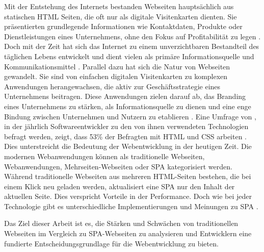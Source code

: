 

Mit der Entstehung des Internets bestanden Webseiten hauptsächlich aus statischen \ac{HTML} Seiten, die oft nur als digitale Visitenkarten dienten. 
Sie präsentierten grundlegende Informationen wie Kontaktdaten, Produkte oder Dienstleistungen eines Unternehmens, ohne den Fokus auf Profitabilität zu legen \cite{Bly2018}.
Doch mit der Zeit hat sich das Internet zu einem unverzichtbaren Bestandteil des täglichen Lebens entwickelt und dient vielen als primäre Informationsquelle und Kommunikationsmittel \cite{conf/pi/Sassenberg}.
Parallel dazu hat sich die Natur von Webseiten gewandelt. 
Sie sind von einfachen digitalen Visitenkarten zu komplexen Anwendungen herangewachsen, die aktiv zur Geschäftsstrategie eines Unternehmens beitragen. 
Diese Anwendungen zielen darauf ab, das Branding eines Unternehmens zu stärken, als Informationsquelle zu dienen und eine enge Bindung zwischen Unternehmen und Nutzern zu etablieren \cite{Bly2018}.
Eine Umfrage von , in der jährlich Softwareentwickler zu den von ihnen verwendeten Technologien befragt werden, zeigt, dass 53\% der Befragten mit \ac{HTML} und \ac{CSS} arbeiten \cite{StackOverflow2023}.
Dies unterstreicht die Bedeutung der Webentwicklung in der heutigen Zeit.
Die modernen Webanwendungen können als traditionelle Webseiten, Webanwendungen, Mehrseiten-Webseiten oder \ac{SPA} kategorisiert werden. 
Während traditionelle Webseiten aus mehreren \ac{HTML}-Seiten bestehen, die bei einem Klick neu geladen werden, aktualisiert eine \ac{SPA} nur den Inhalt der aktuellen Seite. 
Dies verspricht Vorteile in der Performance. Doch wie bei jeder Technologie gibt es unterschiedliche Implementierungen und Meinungen zu \ac{SPA} \cite{Flanagan2011}.

Das Ziel dieser Arbeit ist es, die Stärken und Schwächen von traditionellen Webseiten im Vergleich zu SPA-Webseiten zu analysieren und Entwicklern eine fundierte Entscheidungsgrundlage für die Webentwicklung zu bieten.


